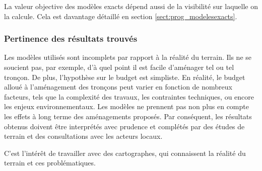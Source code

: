 La valeur objective des modèles exacts dépend aussi de la visibilité sur laquelle on la calcule. Cela est davantage détaillé en section \ref{sect:prog_modelesexacts}.


\subsubsection{Pertinence des résultats trouvés}

Les modèles utilisés sont incomplets par rapport à la réalité du terrain. Ils ne se soucient pas, par exemple, d'à quel point il est facile d'aménager tel ou tel tronçon. De plus, l'hypothèse sur le budget est simpliste. En réalité, le budget alloué à l'aménagement des tronçons peut varier en fonction de nombreux facteurs, tels que la complexité des travaux, les contraintes techniques, ou encore les enjeux environnementaux. Les modèles ne prennent pas non plus en compte les effets à long terme des aménagements proposés. Par conséquent, les résultats obtenus doivent être interprétés avec prudence et complétés par des études de terrain et des consultations avec les acteurs locaux.

C'est l'intérêt de travailler avec des cartographes, qui connaissent la réalité du terrain et ces problématiques.